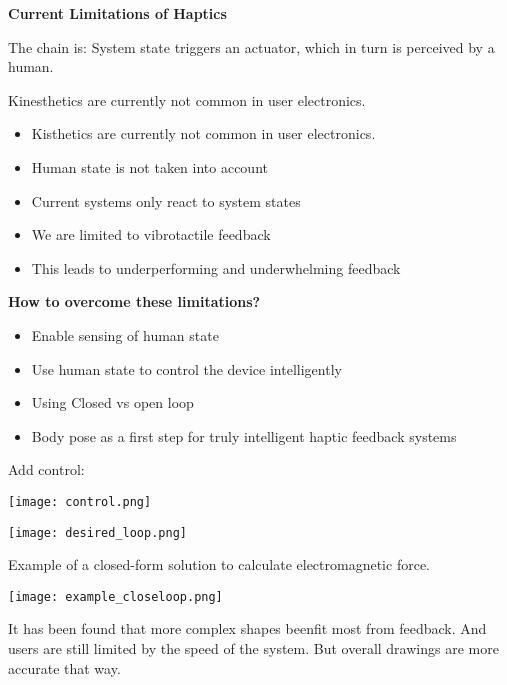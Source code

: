 \textbf{Current Limitations of Haptics} \smallskip

The chain is: System state triggers an actuator, which in turn is perceived by a human.

Kinesthetics are currently not common in user electronics. 

 

\begin{itemize}[itemsep=-5pt, topsep=0pt, leftmargin=*]
	\item Kisthetics are currently not common in user electronics. 
	\item Human state is not taken into account
	\item Current systems only react to system states
	\item We are limited to vibrotactile feedback
	\item This leads to underperforming and underwhelming feedback
\end{itemize} \medskip


\textbf{How to overcome these limitations?}


\begin{itemize}[itemsep=-5pt, topsep=0pt, leftmargin=*]
	\item Enable sensing of human state
	\item Use human state to control the device intelligently
	\item Using Closed vs open loop
	\item Body pose as a first step for truly intelligent haptic feedback systems
\end{itemize} \medskip

Add control:
\begin{center}
	\texttt{[image: control.png]}
\end{center}

\begin{center}
	\texttt{[image: desired\_loop.png]}
\end{center}

\medskip

Example of a closed-form solution to calculate electromagnetic force.
\begin{center}
	\texttt{[image: example\_closeloop.png]}
\end{center}

It has been found that more complex shapes beenfit most from feedback. And users are still limited by the speed of the system. 
But overall drawings are more accurate that way. 


\columnbreak